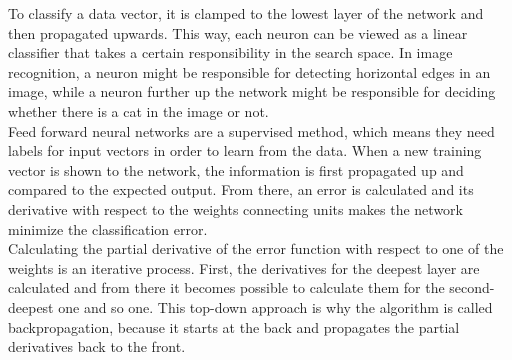 \documentclass[11pt,a4paper]{article}
\begin{document}
To classify a data vector, it is clamped to the lowest layer of the network and then propagated upwards. This way, each neuron can be viewed as a linear classifier that takes a certain responsibility in the search space. In image recognition, a neuron might be responsible for detecting horizontal edges in an image, while a neuron further up the network might be responsible for deciding whether there is a cat in the image or not.\\
Feed forward neural networks are a supervised method, which means they need labels for input vectors in order to learn from the data. When a new training vector is shown to the network, the information is first propagated up and compared to the expected output. From there, an error is calculated and its derivative with respect to the weights connecting units makes the network minimize the classification error.\\
Calculating the partial derivative of the error function with respect to one of the weights is an iterative process. First, the derivatives for the deepest layer are calculated and from there it becomes possible to calculate them for the second-deepest one and so one. This top-down approach is why the algorithm is called backpropagation, because it starts at the back and propagates the partial derivatives back to the front.
\end{document}
